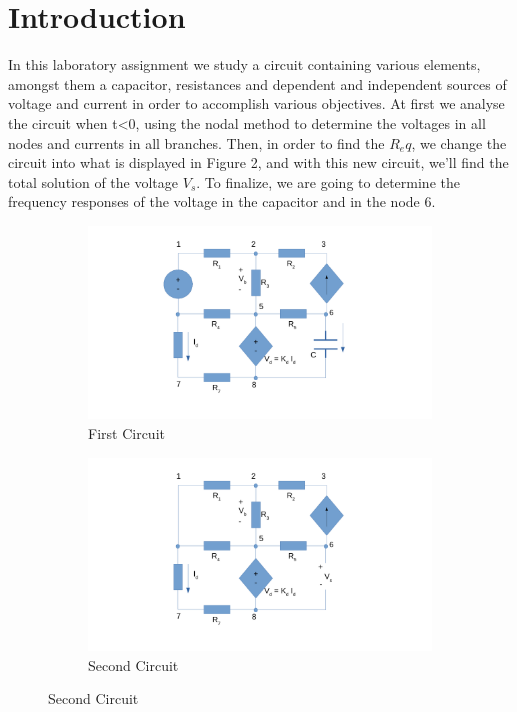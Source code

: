 \newpage
\section{Introduction}
\label{sec:introduction}

In this laboratory assignment we study a circuit containing various elements, amongst them a capacitor, resistances and dependent and independent sources of voltage and current in order to accomplish various objectives. At first we analyse the circuit when t<0, using the nodal method to determine the voltages in all nodes and currents in all branches. Then, in order to find the $R_eq$, we change the circuit into what is displayed in Figure 2, and with this new circuit, we'll find the total solution of the voltage $V_s$. To finalize, we are going to determine the frequency responses of the voltage in the capacitor and in the node 6. 

\begin{figure}[h] \centering

\begin{subfigure}{0.4\textwidth}
\includegraphics[width=\textwidth]{circuit1.pdf}
\caption{First Circuit}
\label{fig:first}
\end{subfigure}
\begin{subfigure}{0.4\textwidth}
\includegraphics[width=\textwidth]{circuit2.pdf}
\caption{Second Circuit}
\label{fig:second}
\end{subfigure}

\end{figure}


